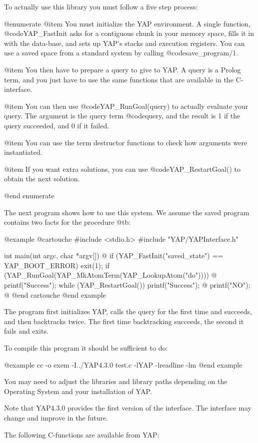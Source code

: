 To actually use this library you must follow a five step process:

@enumerate
@item
 You must initialize the YAP environment. A single function,
@code{YAP_FastInit} asks for a contiguous chunk in your memory space, fills
it in with the data-base, and sets up YAP's stacks and
execution registers. You can use a saved space from a standard system by
calling @code{save_program/1}.
     
@item You then have to prepare a query to give to
YAP. A query is a Prolog term, and you just have to use the same
functions that are available in the C-interface.

@item You can then use @code{YAP_RunGoal(query)} to actually evaluate your
query. The argument is the query term @code{query}, and the result is 1
if the query succeeded, and 0 if it failed.

@item You can use the term destructor functions to check how
arguments were instantiated.

@item If you want extra solutions, you can use
@code{YAP_RestartGoal()} to obtain the next solution.

@end enumerate

The next program shows how to use this system. We assume the saved
program contains two facts for the procedure @t{b}:

@example
@cartouche
#include <stdio.h>
#include "YAP/YAPInterface.h"


int
main(int argc, char *argv[]) @{
  if (YAP_FastInit("saved_state") == YAP_BOOT_ERROR)
    exit(1);
  if (YAP_RunGoal(YAP_MkAtomTerm(YAP_LookupAtom("do")))) @{
    printf("Success\n");
    while (YAP_RestartGoal())
      printf("Success\n");
  @}
  printf("NO\n");
@}
@end cartouche
@end example

The program first initializes YAP, calls the query for the
first time and succeeds, and then backtracks twice. The first time
backtracking succeeds, the second it fails and exits.

To compile this program it should be sufficient to do:

@example
cc -o exem -I../YAP4.3.0 test.c -lYAP -lreadline -lm
@end example

You may need to adjust the libraries and library paths depending on the
Operating System and your installation of YAP.

Note that YAP4.3.0 provides the first version of the interface. The
interface may change and improve in the future.

The following C-functions are available from YAP:

